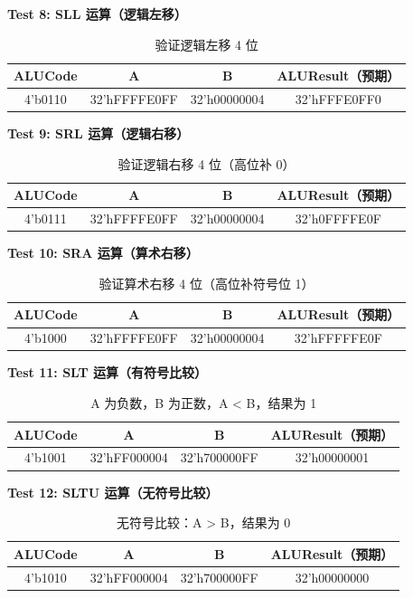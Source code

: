 \documentclass[12pt,a4paper]{article}
\begin{document}
\textbf{Test 8: SLL 运算（逻辑左移）}

\begin{table}[H]
\centering
\begin{tabular}{|c|c|c|c|}
\hline
ALUCode & A & B & ALUResult（预期） \\ \hline
4'b0110 & 32'hFFFFE0FF & 32'h00000004 & 32'hFFFE0FF0 \\ \hline
\end{tabular}
\caption{验证逻辑左移 4 位}
\end{table}

\textbf{Test 9: SRL 运算（逻辑右移）}

\begin{table}[H]
\centering
\begin{tabular}{|c|c|c|c|}
\hline
ALUCode & A & B & ALUResult（预期） \\ \hline
4'b0111 & 32'hFFFFE0FF & 32'h00000004 & 32'h0FFFFE0F \\ \hline
\end{tabular}
\caption{验证逻辑右移 4 位（高位补 0）}
\end{table}

\textbf{Test 10: SRA 运算（算术右移）}

\begin{table}[H]
\centering
\begin{tabular}{|c|c|c|c|}
\hline
ALUCode & A & B & ALUResult（预期） \\ \hline
4'b1000 & 32'hFFFFE0FF & 32'h00000004 & 32'hFFFFFE0F \\ \hline
\end{tabular}
\caption{验证算术右移 4 位（高位补符号位 1）}
\end{table}

\textbf{Test 11: SLT 运算（有符号比较）}

\begin{table}[H]
\centering
\begin{tabular}{|c|c|c|c|}
\hline
ALUCode & A & B & ALUResult（预期） \\ \hline
4'b1001 & 32'hFF000004 & 32'h700000FF & 32'h00000001 \\ \hline
\end{tabular}
\caption{A 为负数，B 为正数，A < B，结果为 1}
\end{table}

\textbf{Test 12: SLTU 运算（无符号比较）}

\begin{table}[H]
\centering
\begin{tabular}{|c|c|c|c|}
\hline
ALUCode & A & B & ALUResult（预期） \\ \hline
4'b1010 & 32'hFF000004 & 32'h700000FF & 32'h00000000 \\ \hline
\end{tabular}
\caption{无符号比较：A > B，结果为 0}
\end{table}
\end{document}

